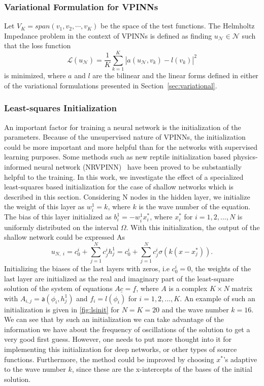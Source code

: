 \subsubsection{Variational Formulation for VPINNs}\label{sec:vpinnsformulation}
Let $V_K = span(v_1, v_2, \cdots, v_K)$ be the space of the test functions. The Helmholtz Impedance problem in the context of VPINNs is defined as finding $u_{\mathcal{N}} \in \mathcal{N}$ such that the loss function
\begin{equation}
    \label{eq:lossfunction}
    \mathcal{L}(u_{\mathcal{N}}) = \frac{1}{K} \sum_{k=1}^{K}{\left|a(u_{\mathcal{N}},v_k)-l(v_k)\right| ^2}
\end{equation}
is minimized, where $a$ and $l$ are the bilinear and the linear forms defined in either of the variational formulations presented in Section~\ref{sec:variational}.

\subsubsection{Least-squares Initialization}\label{sec:lsinit}
An important factor for training a neural network is the initialization of the parameters. Because of the unsupervised nature of VPINNs, the initialization could be more important and more helpful than for the networks with supervised learning purposes. Some methods such as new reptile initialization based physics-informed neural network (NRVPINN)~\cite{liu2021init} have been proved to be substantially helpful to the training. In this work, we investigate the effect of a specialized least-squares based initialization for the case of shallow networks which is described in this section. Considering N nodes in the hidden layer, we initialize the weight of this layer as $w^{1}_{i} = k$, where $k$ is the wave number of the equation. The bias of this layer initialized as $b^{1}_{i} = -w^{1}_{i} x^{*}_{i}$, where $x^{*}_{i}$ for $i=1,2,...,N$ is uniformly distributed on the interval $\Omega$. With this initialization, the output of the shallow network could be expressed As
\begin{equation}
    u_{N,\;i} = c_0^i + \sum_{j=1}^{N}{c_j^i h^1_j} = c_0^i + \sum_{j=1}^{N}{c_j^i \sigma(k(x-x^{*}_j))}.
\end{equation}
Initializing the biases of the last layers with zeros, i.e $c_0^i = 0$, the weights of the last layer are initialized as the real and imaginary part of the least-square solution of the system of equations $A\underline{c}=\underline{f}$, where $A$ is a complex $K \times N$ matrix with $A_{i, j}=\mathsf{a}(\phi_i, h^1_j)$ and $f_i = l(\phi_i)$ for $i=1,2,...,K$. An example of such an initialization is given in \autoref{fig:lsinit} for $N=K=20$ and the wave number $k=16$. We can see that by such an initialization we can take advantage of the information we have about the frequency of oscillations of the solution to get a very good first guess. However, one needs to put more thought into it for implementing this initialization for deep networks, or other types of source functions. Furthermore, the method could be improved by choosing $x^{*}$'s adaptive to the wave number $k$, since these are the x-intercepts of the bases of the initial solution.

